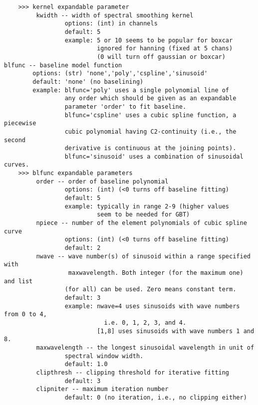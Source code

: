 \begin{verbatim}
    >>> kernel expandable parameter
         kwidth -- width of spectral smoothing kernel
                 options: (int) in channels
                 default: 5
                 example: 5 or 10 seems to be popular for boxcar
                          ignored for hanning (fixed at 5 chans)
                          (0 will turn off gaussian or boxcar)
blfunc -- baseline model function
        options: (str) 'none','poly','cspline','sinusoid'
        default: 'none' (no baselining)
        example: blfunc='poly' uses a single polynomial line of 
                 any order which should be given as an expandable 
                 parameter 'order' to fit baseline. 
                 blfunc='cspline' uses a cubic spline function, a piecewise 
                 cubic polynomial having C2-continuity (i.e., the second 
                 derivative is continuous at the joining points).
                 blfunc='sinusoid' uses a combination of sinusoidal curves. 
    >>> blfunc expandable parameters
         order -- order of baseline polynomial
                 options: (int) (<0 turns off baseline fitting)
                 default: 5
                 example: typically in range 2-9 (higher values
                          seem to be needed for GBT)
         npiece -- number of the element polynomials of cubic spline curve
                 options: (int) (<0 turns off baseline fitting)
                 default: 2
         nwave -- wave number(s) of sinusoid within a range specified with
                  maxwavelength. Both integer (for the maximum one) and list 
                 (for all) can be used. Zero means constant term. 
                 default: 3
                 example: nwave=4 uses sinusoids with wave numbers from 0 to 4,
                            i.e. 0, 1, 2, 3, and 4.
                          [1,8] uses sinusoids with wave numbers 1 and 8.
         maxwavelength -- the longest sinusoidal wavelength in unit of 
                 spectral window width.
                 default: 1.0
         clipthresh -- clipping threshold for iterative fitting
                 default: 3
         clipniter -- maximum iteration number
                 default: 0 (no iteration, i.e., no clipping either)


\end{verbatim}
